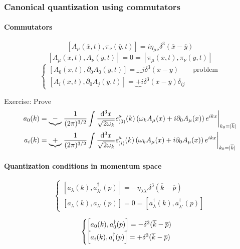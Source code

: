\subsubsection{Canonical quantization using commutators}
\paragraph{Commutators}
\[ \left[A_\mu(\overline{x},t),\pi_\nu(\overline{y},t)\right] = i\eta_{\mu\nu}\delta^3(\overline{x} - \overline{y}) \]
\[ \left[A_\mu(\overline{x},t), A_\nu(\overline{y},t)\right] = 0= \left[\pi_\mu(\overline{x},t),\pi_\nu(\overline{y},t)\right] \]
\[\begin{cases}
\left[A_0(\overline{x},t),\partial_0A_0(\overline{y},t)\right] = \underbrace{-}i\delta^3(\overline{x} - \overline{y}) \qquad \text{problem} \\
\left[A_i(\overline{x},t),\partial_0A_j(\overline{y},t)\right] = \underbrace{+}i\delta^3(\overline{x} - \overline{y})\delta_{ij}
\end{cases}\]

\begin{example}
Exercise: Prove
\begin{align*}
a_0(k) &= \underbrace{-}\left.\frac{1}{(2\pi)^{3/2}}\int \frac{\operatorname{d \!}{^3x}}{\sqrt{2\omega_k}}\epsilon^\mu_{(0)}(k) \left(\omega_kA_\mu(x) + i\partial_0A_\mu(x)\right)e^{ikx}\right|_{k_0=|\overline{k}|} \\
a_i(k) &= \underbrace{+}\left.\frac{1}{(2\pi)^{3/2}}\int \frac{\operatorname{d \!}{^3x}}{\sqrt{2\omega_k}}\epsilon^\mu_{(i)}(k) \left(\omega_kA_\mu(x) + i\partial_0A_\mu(x)\right)e^{ikx}\right|_{k_0=|\overline{k}|}
\end{align*}
\end{example}

\paragraph{Quantization conditions in momentum space}
\[ \begin{cases}
\left[a_\lambda(k), a^\dagger_{\lambda'}(p)\right] = -\eta_{\lambda\lambda'}\delta^3(\overline{k} - \overline{p}) \\
\left[a_\lambda(k), a_{\lambda'}(p)\right] = 0 = \left[a^\dagger_\lambda(k), a^\dagger_{\lambda'}(p)\right]
\end{cases} \]

\[ \begin{cases}
\left[a_0(k), a_0^\dagger(p)\right] = -\delta^3(\overline{k}- \overline{p}) \\ \vspace{.2em}
\left[a_i(k), a_i^\dagger(p)\right] = +\delta^3(\overline{k}- \overline{p})
\end{cases} \]

